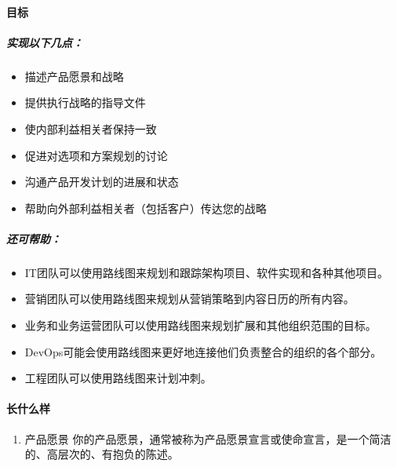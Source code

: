 \documentclass[letterpaper,11pt,english]{sphinxmanual}
\begin{document}
\paragraph{目标}
\label{\detokenize{chapter_project/Roadmap:id1}}

\subparagraph{实现以下几点：}
\label{\detokenize{chapter_project/Roadmap:id2}}\begin{itemize}
\item {} 
描述产品愿景和战略

\item {} 
提供执行战略的指导文件

\item {} 
使内部利益相关者保持一致

\item {} 
促进对选项和方案规划的讨论

\item {} 
沟通产品开发计划的进展和状态

\item {} 
帮助向外部利益相关者（包括客户）传达您的战略

\end{itemize}


\subparagraph{还可帮助：}
\label{\detokenize{chapter_project/Roadmap:id3}}\begin{itemize}
\item {} 
IT团队可以使用路线图来规划和跟踪架构项目、软件实现和各种其他项目。

\item {} 
营销团队可以使用路线图来规划从营销策略到内容日历的所有内容。

\item {} 
业务和业务运营团队可以使用路线图来规划扩展和其他组织范围的目标。

\item {} 
DevOps可能会使用路线图来更好地连接他们负责整合的组织的各个部分。

\item {} 
工程团队可以使用路线图来计划冲刺。

\end{itemize}


\paragraph{长什么样}
\label{\detokenize{chapter_project/Roadmap:id4}}\begin{enumerate}
%
\item {} 
产品愿景
你的产品愿景，通常被称为产品愿景宣言或使命宣言，是一个简洁的、高层次的、有抱负的陈述。

\end{enumerate}
\end{document}
